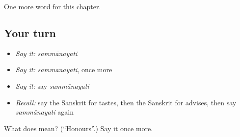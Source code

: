 \begin{grammarlens}[title={What you've built}]
One more word for this chapter.
\end{grammarlens}

\subsection*{Your turn}
\begin{itemize}
\raggedright
  \item \emph{Say it:} \emph{sammānayati}
  \item \emph{Say it:} \emph{sammānayati}, once more
  \item \emph{Say it:} say \emph{sammānayati}
  \item \emph{Recall:} say the Sanskrit for tastes, then the Sanskrit for advises, then say \emph{sammānayati} again
\end{itemize}

\begin{tcolorbox}[breakable,colback=teal!4,colframe=teal!35!black,title={Before you move on}]
What does  mean? (\textquotedblleft{}Honours\textquotedblright{}.) Say it once more.
\end{tcolorbox}
